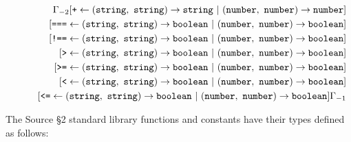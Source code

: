 \begin{eqnarray*}
 & &
      \Gamma_{-2}
                 [ \texttt{+} \leftarrow (\texttt{string},\ \texttt{string}) \rightarrow \texttt{string}\ |\ (\texttt{number},\ \texttt{number}) \rightarrow \texttt{number}] \\
&& \hspace{6mm}  [ \texttt{===} \leftarrow (\texttt{string},\ \texttt{string}) \rightarrow \texttt{boolean}\ |\ (\texttt{number},\ \texttt{number}) \rightarrow \texttt{boolean}] \\
&& \hspace{6mm}  [ \texttt{!==} \leftarrow (\texttt{string},\ \texttt{string}) \rightarrow \texttt{boolean}\ |\ (\texttt{number},\ \texttt{number}) \rightarrow \texttt{boolean}] \\
&& \hspace{6mm}  [ \texttt{>} \leftarrow (\texttt{string},\ \texttt{string}) \rightarrow \texttt{boolean}\ |\ (\texttt{number},\ \texttt{number}) \rightarrow \texttt{boolean}]\\
&& \hspace{6mm}  [ \texttt{>=} \leftarrow (\texttt{string},\ \texttt{string}) \rightarrow \texttt{boolean}\ |\ (\texttt{number},\ \texttt{number}) \rightarrow \texttt{boolean}]\\
&& \hspace{6mm}  [ \texttt{<} \leftarrow (\texttt{string},\ \texttt{string}) \rightarrow \texttt{boolean}\ |\ (\texttt{number},\ \texttt{number}) \rightarrow \texttt{boolean}] \\
&& \hspace{6mm}  [ \texttt{<=} \leftarrow (\texttt{string},\ \texttt{string}) \rightarrow \texttt{boolean}\ |\ (\texttt{number},\ \texttt{number}) \rightarrow \texttt{boolean}]\Gamma_{-1}
\end{eqnarray*}

The Source \S 2 standard library functions and constants have their types defined as follows:

